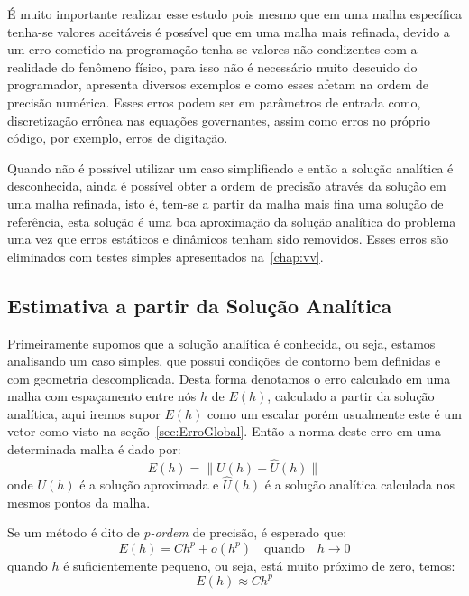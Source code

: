 \documentclass[
	12pt,				  %
	openright,		%
	twoside,			%
	a4paper,			%
	chapter=TITLE,		    %
	english,			%
	brazil				%
	]{abntex2}
\begin{document}
É muito importante realizar esse estudo pois mesmo que em uma malha específica
tenha-se valores aceitáveis é possível que em uma malha mais refinada, devido a
um erro cometido na programação tenha-se valores não condizentes com a
realidade do fenômeno físico, para isso não é necessário muito descuido do
programador,  apresenta diversos exemplos e como esses
afetam na ordem de precisão numérica. Esses erros podem ser em parâmetros de
entrada como, discretização errônea nas equações governantes, assim como erros
no próprio código, por exemplo, erros de digitação. 

Quando não é possível utilizar um caso simplificado e então a solução analítica
é desconhecida, ainda é possível obter a ordem de precisão através da solução
em uma malha refinada, isto é, tem-se a partir da malha mais fina uma solução
de referência, esta solução é uma boa aproximação da solução analítica do
problema uma vez que erros estáticos e dinâmicos tenham sido removidos. Esses
erros são eliminados com testes simples apresentados na~\autoref{chap:vv}. 

\subsection{Estimativa a partir da Solução Analítica}\label{sec:orderfromexact}

Primeiramente supomos que a solução analítica é conhecida, ou seja, estamos
analisando um caso simples, que possui condições de contorno bem definidas e
com geometria descomplicada. Desta forma denotamos o erro calculado em uma
malha com espaçamento entre nós $h$ de $E(h)$, calculado a partir da solução
analítica, aqui iremos supor $E(h)$ como um escalar porém usualmente este é um
vetor como visto na seção~\ref{sec:ErroGlobal}. Então a norma deste erro em uma
determinada malha é dado por:
\begin{equation}
    E(h) = \| U(h) - \hat{U}(h)\|
\end{equation}
onde $U(h)$ é a solução aproximada e $\hat{U}(h)$ é a solução analítica
calculada nos mesmos pontos da malha. 

Se um método é dito de \textit{p-ordem} de precisão, é esperado que:
\begin{equation}
    E(h) = Ch^p + o(h^p)\quad \text{quando}\quad h \to 0
\end{equation}
quando $h$ é suficientemente pequeno, ou seja, está muito próximo de zero,
temos:
\begin{equation}
    E(h) \approx Ch^p
    \label{eq:ordererror}
\end{equation}
\end{document}
